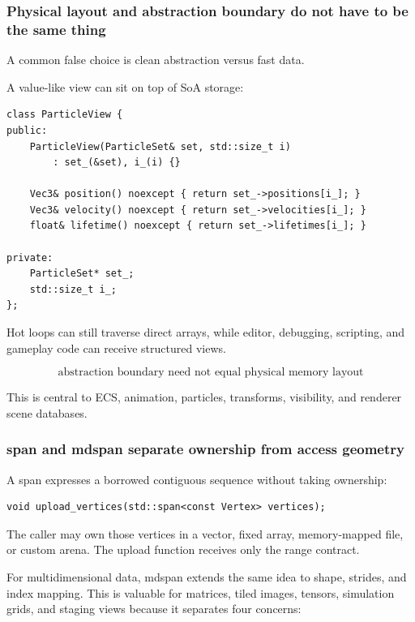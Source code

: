 \subsubsection{Physical layout and abstraction boundary do not have to be the same thing}\label{01-foundations-i-ch005-physical-layout-and-abstraction-boundary-do-not-have-to-be-the-same-thing}

A common false choice is clean abstraction versus fast data.

A value-like view can sit on top of SoA storage:

\begin{verbatim}
class ParticleView {
public:
    ParticleView(ParticleSet& set, std::size_t i)
        : set_(&set), i_(i) {}

    Vec3& position() noexcept { return set_->positions[i_]; }
    Vec3& velocity() noexcept { return set_->velocities[i_]; }
    float& lifetime() noexcept { return set_->lifetimes[i_]; }

private:
    ParticleSet* set_;
    std::size_t i_;
};
\end{verbatim}

Hot loops can still traverse direct arrays, while editor, debugging, scripting, and gameplay code can receive structured views.

\[
\boxed{
\text{abstraction boundary need not equal physical memory layout}
}
\]

This is central to ECS, animation, particles, transforms, visibility, and renderer scene databases.

\subsubsection{span and mdspan separate ownership from access geometry}\label{01-foundations-i-ch005-span-and-mdspan-separate-ownership-from-access-geometry}

A span expresses a borrowed contiguous sequence without taking ownership:

\begin{verbatim}
void upload_vertices(std::span<const Vertex> vertices);
\end{verbatim}

The caller may own those vertices in a vector, fixed array, memory-mapped file, or custom arena. The upload function receives only the range contract.

For multidimensional data, mdspan extends the same idea to shape, strides, and index mapping. This is valuable for matrices, tiled images, tensors, simulation grids, and staging views because it separates four concerns:

